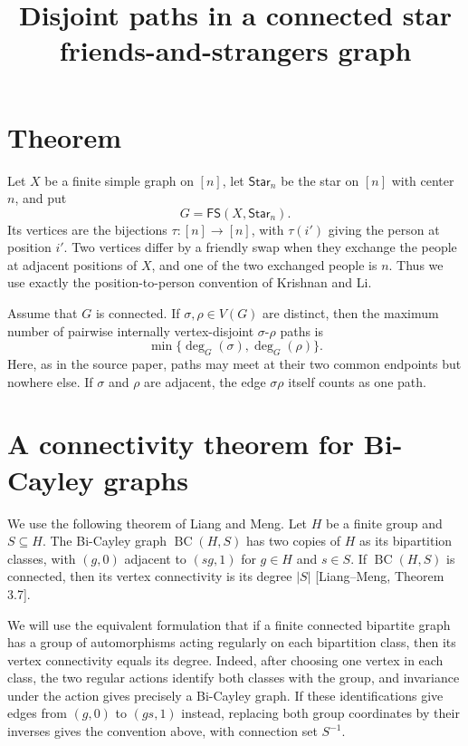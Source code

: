 \documentclass[11pt]{article}
\title{Disjoint paths in a connected star friends-and-strangers graph}
\author{}
\date{}
\begin{document}
\maketitle

\section*{Theorem}

Let \(X\) be a finite simple graph on \([n]\), let \(\mathsf{Star}_n\) be the star on \([n]\) with center \(n\), and put
\[
G=\mathsf{FS}(X,\mathsf{Star}_n).
\]
Its vertices are the bijections \(\tau:[n]\to[n]\), with \(\tau(i')\) giving the person at position \(i'\). Two vertices differ by a friendly swap when they exchange the people at adjacent positions of \(X\), and one of the two exchanged people is \(n\). Thus we use exactly the position-to-person convention of Krishnan and Li.

Assume that \(G\) is connected. If \(\sigma,\rho\in V(G)\) are distinct, then the maximum number of pairwise internally vertex-disjoint \(\sigma\)-\(\rho\) paths is
\[
\min\{\deg_G(\sigma),\deg_G(\rho)\}.
\]
Here, as in the source paper, paths may meet at their two common endpoints but nowhere else. If \(\sigma\) and \(\rho\) are adjacent, the edge \(\sigma\rho\) itself counts as one path.

\section*{A connectivity theorem for Bi-Cayley graphs}

We use the following theorem of Liang and Meng. Let \(H\) be a finite group and \(S\subseteq H\). The Bi-Cayley graph \(\operatorname{BC}(H,S)\) has two copies of \(H\) as its bipartition classes, with \((g,0)\) adjacent to \((sg,1)\) for \(g\in H\) and \(s\in S\). If \(\operatorname{BC}(H,S)\) is connected, then its vertex connectivity is its degree \(|S|\) [Liang--Meng, Theorem 3.7].

We will use the equivalent formulation that if a finite connected bipartite graph has a group of automorphisms acting regularly on each bipartition class, then its vertex connectivity equals its degree. Indeed, after choosing one vertex in each class, the two regular actions identify both classes with the group, and invariance under the action gives precisely a Bi-Cayley graph. If these identifications give edges from \((g,0)\) to \((gs,1)\) instead, replacing both group coordinates by their inverses gives the convention above, with connection set \(S^{-1}\).
\end{document}
